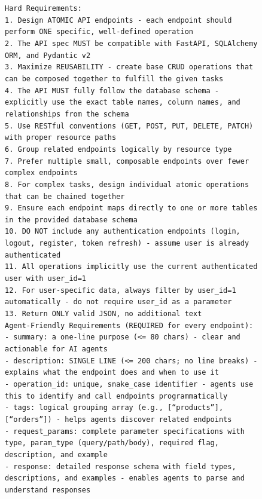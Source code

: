 \begin{figure}[p]
{\begin{minipage}{0.97\textwidth}
        \texttt{Hard Requirements:}\\
        \texttt{1. Design ATOMIC API endpoints - each endpoint should perform ONE specific, well-defined operation}\\
        \texttt{2. The API spec MUST be compatible with FastAPI, SQLAlchemy ORM, and Pydantic v2}\\
        \texttt{3. Maximize REUSABILITY - create base CRUD operations that can be composed together to fulfill the given tasks}\\
        \texttt{4. The API MUST fully follow the database schema - explicitly use the exact table names, column names, and relationships from the schema}\\
        \texttt{5. Use RESTful conventions (GET, POST, PUT, DELETE, PATCH) with proper resource paths}\\
        \texttt{6. Group related endpoints logically by resource type}\\
        \texttt{7. Prefer multiple small, composable endpoints over fewer complex endpoints}\\
        \texttt{8. For complex tasks, design individual atomic operations that can be chained together}\\
        \texttt{9. Ensure each endpoint maps directly to one or more tables in the provided database schema}\\
        \texttt{10. DO NOT include any authentication endpoints (login, logout, register, token refresh) - assume user is already authenticated}\\
        \texttt{11. All operations implicitly use the current authenticated user with user\_id=1}\\
        \texttt{12. For user-specific data, always filter by user\_id=1 automatically - do not require user\_id as a parameter}\\
        \texttt{13. Return ONLY valid JSON, no additional text}\\[4pt]

        \texttt{Agent-Friendly Requirements (REQUIRED for every endpoint):}\\
        \texttt{- summary: a one-line purpose (<= 80 chars) - clear and actionable for AI agents}\\
        \texttt{- description: SINGLE LINE (<= 200 chars; no line breaks) - explains what the endpoint does and when to use it}\\
        \texttt{- operation\_id: unique, snake\_case identifier - agents use this to identify and call endpoints programmatically}\\
        \texttt{- tags: logical grouping array (e.g., [``products''], [``orders'']) - helps agents discover related endpoints}\\
        \texttt{- request\_params: complete parameter specifications with type, param\_type (query/path/body), required flag, description, and example}\\
        \texttt{- response: detailed response schema with field types, descriptions, and examples - enables agents to parse and understand responses}\\[4pt]


\end{minipage}}
\end{figure}
